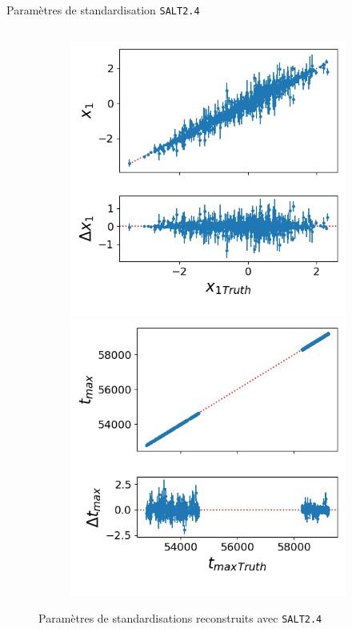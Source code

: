 \documentclass{beamer}
\def\saltd{\texttt{SALT2.4}\xspace}
\begin{document}
\begin{frame}{Paramètres de standardisation \saltd}
\begin{columns}
\begin{column}{.8\textwidth}
\begin{figure}
	\begin{subfigure}{0.49\textwidth}
		\centering
		\includegraphics[width=.7\textwidth]{figures/salt_x1_new.png}
		\includegraphics[width=.7\textwidth]{figures/salt_tmax_new.png}
	\end{subfigure}
	\caption{Paramètres de standardisations reconstruits avec \saltd}
\end{figure}
\end{column}
\end{columns}
\end{frame}
\end{document}
